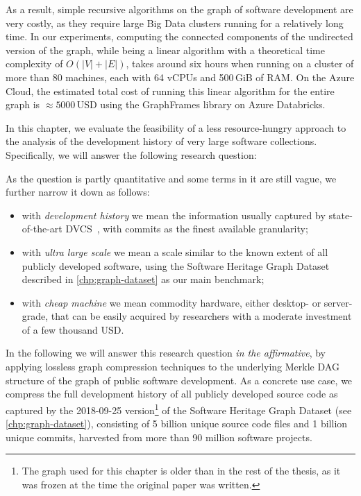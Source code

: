 As a result, simple recursive algorithms on the graph of software development
are very costly, as they require large Big Data clusters running for a
relatively long time. In our experiments, computing the connected components of
the undirected version of the graph, while being a linear algorithm with a
theoretical time complexity of $O(|V| + |E|)$, takes around six hours when
running on a cluster of more than 80 machines, each with 64 vCPUs and 500\,GiB
of RAM\@. On the Azure Cloud, the estimated total cost of running this linear
algorithm for the entire graph is $\approx \num{5000}$\,USD using the
GraphFrames library on Azure Databricks.

In this chapter, we evaluate the feasibility of a less resource-hungry approach
to the analysis of the development history of very large software collections.
Specifically, we will answer the following research question:

\vspace{1em}

\noindent{}

\vspace{1em}

As the question is partly quantitative and some terms in it are still vague, we
further narrow it down as follows:
\begin{itemize}

\item with \emph{development history} we mean the information usually captured
  by state-of-the-art DVCS~\cite{spinellis2005vcs}, with commits as the finest
  available granularity;

\item with \emph{ultra large scale} we mean a scale similar to the known extent
  of all publicly developed software, using the Software Heritage Graph Dataset
  described in \cref{chp:graph-dataset} as our main benchmark;

\item with \emph{cheap machine} we mean commodity hardware, either desktop- or
  server-grade, that can be easily acquired by researchers with a moderate
  investment of a few thousand USD\@.

\end{itemize}

In the following we will answer this research question \emph{in the
  affirmative}, by applying lossless graph compression techniques to the
underlying Merkle DAG structure of the graph of public software development. As
a concrete use case, we compress the full development history of all publicly
developed source code as captured by the 2018-09-25 version\footnote{The graph
used for this chapter is older than in the rest of the thesis, as it was frozen
at the time the original paper was written.} of the Software Heritage Graph
Dataset (see \cref{chp:graph-dataset}), consisting of 5 billion unique source
code files and 1 billion unique commits, harvested from more than 90 million
software projects.

